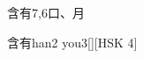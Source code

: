 \begin{entry}{含有}{7,6}{⼝、⽉}
  \begin{phonetics}{含有}{han2 you3}[][HSK 4]
  \end{phonetics}
\end{entry}
